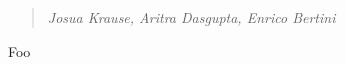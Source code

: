
\begin{quote}
\textit{Josua Krause, Aritra Dasgupta, Enrico Bertini}
\end{quote}

\begin{contributions}{Foo}
\item {}
\end{contributions}